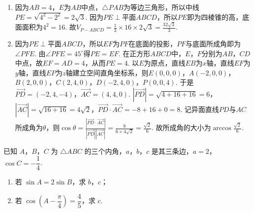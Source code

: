 \begin{solution}
\begin{enumerate}\item 因为\(AB=4\)，\(E\)为\(AB\)中点，\(\triangle PAB\)为等边三角形，所以中线\(PE=\sqrt{4^{2}-2^{2}}=2\sqrt{3}\). 因为\(PE\perp\)平面\(ABCD\)，所以\(PE\)即为四棱锥的高，底面面积为\(4^{2}=16\). 故\(V_{P-ABCD}=\frac{1}{3}\times 16\times 2\sqrt{3}=\frac{32\sqrt{3}}{3}\). \item 因为\(PE\perp\)平面\(ABCD\)，所以\(EF\)为\(PF\)在底面的投影，\(PF\)与底面所成角即为\(\angle PFE\). 由\(\angle PFE=45^{\circ}\)得\(PE=EF\). 在正方形\(ABCD\)中，\(E\)，\(F\)分别为\(AB\)，\(CD\)中点，故\(EF=AD=4\)，从而\(PE=4\). 以\(E\)为原点，直线\(EB\)为\(x\)轴，直线\(EF\)为\(y\)轴，直线\(EP\)为\(z\)轴建立空间直角坐标系，则\(E(0,0,0)\)，\(A(-2,0,0)\)，\(B(2,0,0)\)，\(C(2,4,0)\)，\(D(-2,4,0)\)，\(P(0,0,4)\). 于是\(\overrightarrow{PD}=(-2,4,-4)\)，\(\overrightarrow{AC}=(4,4,0)\). \(|\overrightarrow{PD}|=\sqrt{4+16+16}=6\)，\(|\overrightarrow{AC}|=\sqrt{16+16}=4\sqrt{2}\)，\(\overrightarrow{PD}\cdot\overrightarrow{AC}=-8+16+0=8\). 记异面直线\(PD\)与\(AC\)所成角为\(\theta\)，则\(\cos\theta=\frac{|\overrightarrow{PD}\cdot\overrightarrow{AC}|}{|\overrightarrow{PD}||\overrightarrow{AC}|}=\frac{8}{6\times 4\sqrt{2}}=\frac{\sqrt{2}}{6}\). 故所成角的大小为\(\arccos\frac{\sqrt{2}}{6}\). \end{enumerate}
\end{solution}

\begin{problem}
已知 \(A\)，\(B\)，\(C\) 为 \(\triangle ABC\) 的三个内角，\(a\)，\(b\)，\(c\) 是其三条边，\(a=2\)，\(\cos C=-\dfrac14\).
\begin{enumerate}
\item 若 \(\sin A=2\sin B\)，求 \(b\)，\(c\)；
\item 若 \(\cos\left(A-\dfrac{\pi}{4}\right)=\dfrac45\)，求 \(c\).
\end{enumerate}
\end{problem}

